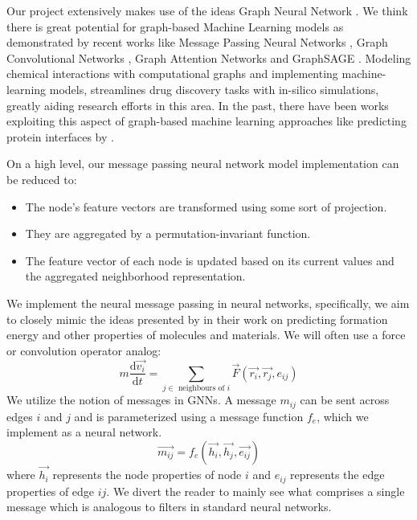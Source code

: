 \documentclass[fontsize=11pt]{article}
\begin{document}
Our project extensively makes use of the ideas Graph Neural Network \citep{4700287}. We think there is great potential for graph-based Machine Learning models as demonstrated by recent works like Message Passing Neural Networks \citep{gilmer2017neural}, Graph Convolutional Networks \citep{https://doi.org/10.48550/arxiv.1609.02907}, Graph Attention Networks \citep{https://doi.org/10.48550/arxiv.1710.10903} and GraphSAGE \citep{hamilton2017inductive}. Modeling chemical interactions with computational graphs and implementing machine-learning models, streamlines drug discovery tasks with in-silico simulations, greatly aiding research efforts in this area. In the past, there have been works exploiting this aspect of graph-based machine learning approaches like predicting protein interfaces by \cite{fout2017protein}.

On a high level, our message passing neural network model implementation can be reduced \citep{daglignns} to:
\begin{itemize}
    \item The node’s feature vectors are transformed using some sort of projection.
    \item They are aggregated by a permutation-invariant function.
    \item The feature vector of each node is updated based on its current values and the aggregated neighborhood representation.
\end{itemize}

We implement the neural message passing \citep{jorgensen2018neural, gilmer2017neural} in neural networks, specifically, we aim to closely mimic the ideas presented by \cite{jorgensen2018neural} in their work on predicting formation energy and other properties of molecules and materials. We will often use a force or convolution operator analog:
\begin{equation*}
    m\frac{\mathrm{d} \vec{v_i}}{\mathrm{d}t} = \sum_{j \in \textrm{ neighbours of } i } \vec{F}(\vec{r_i}, \vec{r_j}, e_{ij})
\end{equation*}
We utilize the notion of messages in GNNs. A message $m_{ij}$ can be sent across edges $i$ and $j$ and is parameterized using a message function $f_e$, which we implement as a neural network.
\begin{equation*}
    \vec{m_{ij}}=f_e(\vec{h_i}, \vec{h_j}, \vec{e_{ij}})
\end{equation*}
where $\vec{h_i}$ represents the node properties of node $i$ and $e_{ij}$ represents the edge properties of edge $ij$. We divert the reader to mainly see what comprises a single message which is analogous to filters in standard neural networks.
\end{document}

